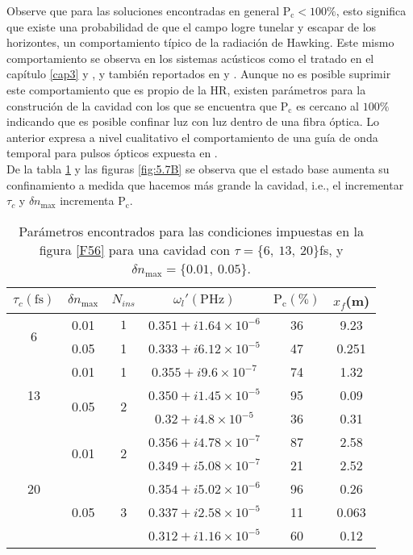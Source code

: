 Observe que para las soluciones encontradas en general $\text{P}_{\text{c}}< 100\%$, esto significa que existe una probabilidad de que el campo logre tunelar y escapar de los horizontes, un comportamiento t\'{i}pico de la radiaci\'{o}n de Hawking. Este mismo comportamiento se observa en los sistemas ac\'{u}sticos como el tratado en el cap\'{i}tulo \ref{cap3} y \cite{2018Bermudez}, y tambi\'{e}n reportados en \cite{curtis2019evanescent} y \cite{coutant2019slow}. Aunque no es posible suprimir este comportamiento que es propio de la HR, existen par\'{a}metros para la construci\'{o}n de la cavidad con los que se encuentra que $\text{P}_{\text{c}}$ es cercano al $100\%$ indicando que es posible confinar luz con luz dentro de una fibra \'{o}ptica. Lo anterior expresa a nivel cualitativo el comportamiento de una gu\'{i}a de onda temporal para pulsos \'{o}pticos expuesta en \cite{Plansinis2016}.\\

De la tabla \ref{tabla:1} y las figuras \ref{fig:5.7B} se observa que el estado base aumenta su confinamiento a medida que hacemos m\'as grande la cavidad, i.e., el incrementar $\tau_c$ y $\delta n_{\text{max}}$ incrementa $\text{P}_{\text{c}}$.\\

\begin{table}
\centering
\begin{tabular}{|c|c|c|c|c|c|}\hline
$\tau_c(\text{fs})$&$\delta n_\text{{max}}$&$N_{ins}$&$\omega_l '(\text{PHz})$& $\text{P}_{\text{c}}(\%)$&$x_f$(m)\\
\hline \hline
\multirow{2}{*}{6} & 0.01 & $1$&$0.351+i 1.64\times10^{-6}$&36&9.23\\ \cline{2-6}
& 0.05 &1&$0.333+i6.12\times 10^{-5}$& 47&0.251\\ \cline{1-6}
\multirow{3}{*}{13} & \multirow{1}{*}{0.01}& \multirow{1}{*}{1}& $0.355+i9.6\times10^{-7}$ &74&1.32\\ \cline{2-6}
 & \multirow{2}{*}{0.05}& \multirow{2}{*}{2}& $0.350+i1.45\times10^{-5}$&95&0.09\\ \cline{4-6}
&&&$0.32+i4.8\times10^{-5}$&36&0.31\\ \cline{1-6}
\multirow{5}{*}{20} & \multirow{2}{*}{0.01}& \multirow{2}{*}{2}& $0.356+i4.78\times10^{-7}$ &87&2.58\\ \cline{4-6}
&&&$0.349+i5.08\times10^{-7}$&21&2.52\\ \cline{2-6}
 & \multirow{3}{*}{0.05}& \multirow{3}{*}{3}&$0.354+i5.02\times10^{-6}$ &96&0.26\\ \cline{4-6}
&&&$0.337+i2.58\times10^{-5}$&11&0.063\\ \cline{4-6}
&&&$0.312+i1.16\times10^{-5}$&60&0.12\\ \cline{1-6}
\end{tabular}
\caption{Par\'{a}metros encontrados para las condiciones impuestas en la figura \ref{F56} para una cavidad con $\tau=\{6,\ 13, \ 20\}$fs, y $\delta n_{\text{max}}=\{0.01,\ 0.05\}$.}
\label{tabla:1}
\end{table}

